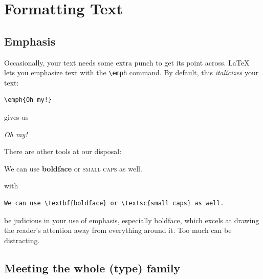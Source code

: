 \chapter{Formatting Text}

\section{Emphasis}

Occasionally, your text needs some extra punch to get its point across.
\LaTeX{} lets you emphasize text with the \verb|\emph| command.
By default, this \emph{italicizes} your text:
\begin{leftfigure}
\begin{lstlisting}
\emph{Oh my!}
\end{lstlisting}
\end{leftfigure}
gives us
\begin{leftfigure}
\lm \emph{Oh my!}
\end{leftfigure}
There are other tools at our disposal:
\begin{leftfigure}
\lm We can use \textbf{boldface} or \textsc{small caps} as well.
\end{leftfigure}
with
\begin{leftfigure}
\begin{lstlisting}
We can use \textbf{boldface} or \textsc{small caps} as well.
\end{lstlisting}
\end{leftfigure}
be judicious in your use of emphasis, especially boldface,
which excels at drawing the reader's attention away from everything around it.
Too much can be distracting.

\section{Meeting the whole (type) family}


